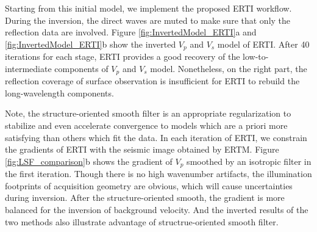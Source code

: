 Starting from this initial model, we implement the proposed ERTI workflow.
During the inversion, the direct waves are muted to make sure that only the reflection data are involved.
Figure \ref{fig:InvertedModel_ERTI}a and \ref{fig:InvertedModel_ERTI}b show the inverted $V_p$ and $V_s$ model of ERTI.
After
40 iterations for each stage, ERTI provides a good recovery of the low-to-intermediate components of
$V_p$ and $V_s$ model. 
Nonetheless, on the right part, the reflection coverage of surface observation is insufficient for
ERTI to rebuild the long-wavelength components. 

Note, the structure-oriented smooth filter is an appropriate regularization to stabilize
and even accelerate convergence to models which are a priori more satisfying than others which fit
the data. In each iteration of ERTI, we constrain the gradients of ERTI with the seismic image
obtained by ERTM. Figure \ref{fig:LSF_comparison}b shows the gradient of
$V_p$ smoothed by an isotropic filter in the first iteration. Though there is no high wavenumber
artifacts, the illumination footprints of acquisition geometry are obvious, which will cause
uncertainties during inversion. After the structure-oriented smooth, the gradient is more balanced
for the inversion of background velocity. And the inverted results of the two methods also
illustrate advantage of structrue-oriented smooth filter.

